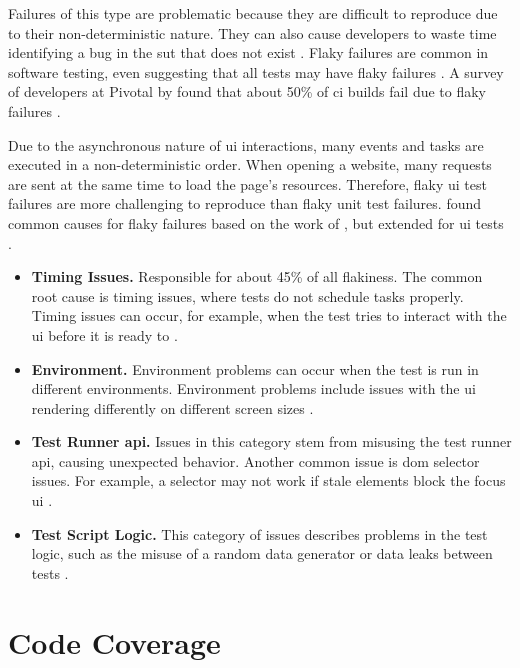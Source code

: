 Failures of this type are problematic because they are difficult to reproduce due to their non-deterministic nature.
They can also cause developers to waste time identifying a bug in the \ac{sut} that does not exist \autocite{ziftci_-flake_2020}.
Flaky failures are common in software testing, \citeauthor*{harman_start-ups_2018} even suggesting that all tests may have flaky failures \autocite{harman_start-ups_2018}.
A survey of developers at Pivotal by \citeauthor*{hilton_trade-offs_2017} found that about 50\% of \ac{ci} builds fail due to flaky failures \autocite{hilton_trade-offs_2017}.

Due to the asynchronous nature of \ac{ui} interactions, many events and tasks are executed in a non-deterministic order.
When opening a website, many requests are sent at the same time to load the page's resources.
Therefore, flaky \ac{ui} test failures are more challenging to reproduce than flaky unit test failures.
 found common causes for flaky failures based on the work of \citeauthor*{luo_empirical_2014}, but extended for \ac{ui} tests \autocite{luo_empirical_2014,romano_empirical_2021}.

\begin{itemize}
	\item \textbf{Timing Issues.} Responsible for about 45\% of all flakiness. The common root cause is timing issues, where tests do not schedule tasks properly.
	      Timing issues can occur, for example, when the test tries to interact with the \ac{ui} before it is ready to \autocite{romano_empirical_2021}.
	\item \textbf{Environment.} Environment problems can occur when the test is run in different environments.
	      Environment problems include issues with the \ac{ui} rendering differently on different screen sizes \autocite{romano_empirical_2021}.
	\item \textbf{Test Runner \acs{api}.} Issues in this category stem from misusing the test runner \ac{api}, causing unexpected behavior.
	      Another common issue is \ac{dom} selector issues. For example, a selector may not work if stale elements block the focus \ac{ui} \autocite{romano_empirical_2021}.
	\item \textbf{Test Script Logic.} This category of issues describes problems in the test logic, such as the misuse of a random data generator or data leaks between tests \autocite{romano_empirical_2021}.
\end{itemize}


\section{Code Coverage}

